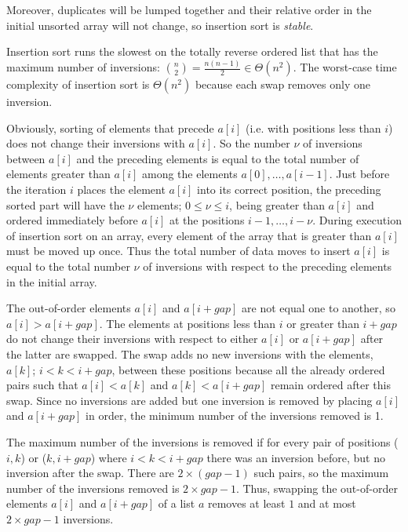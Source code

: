 Moreover, duplicates will be lumped together and
their relative order in the initial unsorted array will not change, so insertion sort
is {\em stable}.

Insertion sort runs the slowest on the totally reverse ordered list that
has the maximum number of inversions: \( \binom{n}{2} = \frac{n(n-1)}{2}\in\Theta(n^2)\).
The worst-case time complexity of insertion sort is \(\Theta(n^2)\) because each 
swap removes only one inversion.

Obviously, sorting of elements that precede $a[i]$ (i.e. with positions less than $i$) does not change their inversions with \(a[i]\). 
So the number $\nu$ of inversions between \(a[i]\) and the preceding elements
is equal to the total number of elements greater than \(a[i]\) among the elements $a[0],\ldots,a[i-1]$. Just before 
the iteration $i$ places the element \(a[i]\) into its correct position, the preceding sorted part will have the $\nu$ elements;
$0\leq\nu\leq i$, being greater than \(a[i]\) and ordered
immediately before $a[i]$ at the positions $i-1,\ldots,i-\nu$. During execution of insertion sort on an array, every element 
of the array that is greater 
than \(a[i]\) must be moved up once. Thus the 
total number of data moves to insert \(a[i]\) is equal to the total number \(\nu\) of inversions with respect to the preceding elements 
in the initial array.

The out-of-order elements \(a[i]\) and \(a[i+gap]\) are not equal one to another, so $a[i] > a[i+gap]$.
The elements at positions less than \(i\) or greater than \(i+gap\) do not change 
their inversions with respect to either \(a[i]\) or \(a[i+gap]\) after the latter are swapped. 
The swap adds no new inversions with the elements, $a[k]$; $i < k < i+gap$,   between these positions
because all the already ordered pairs such that $a[i] < a[k]$ and $a[k] < a[i+gap]$  
remain ordered after this swap. Since no inversions are added but one inversion is removed 
by placing \(a[i]\) and \(a[i+gap]\) in order, the minimum number of the inversions removed is 1. 

The maximum number of the inversions is removed if for every pair of positions (\(i,k\)) or (\(k,i+gap\)) where \(i < k < i+gap\) there 
was an inversion before, but no inversion after the swap. There are \(2\times(gap-1)\) such pairs, so the maximum
number of the inversions removed is \(2\times gap-1\). 
Thus, swapping the out-of-order elements \(a[i]\) and \(a[i+gap]\) of a list \(a\) removes at least \(1\) and at most \(2\times gap-1\)
inversions.


